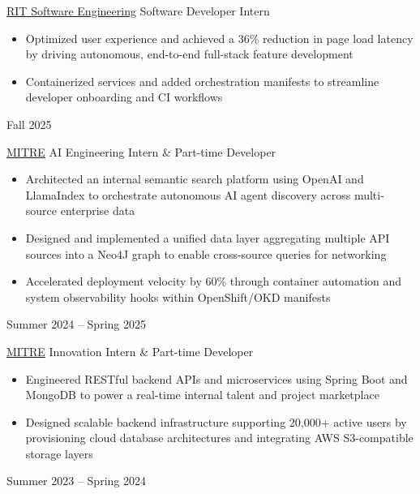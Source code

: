 \cvexperience
        {\href{https://www.rit.edu/computing/department-software-engineering}{RIT Software Engineering}}
        {Software Developer Intern}
        {
                \begin{itemize}
                        \item Optimized user experience and achieved a 36\% reduction in page load latency by driving autonomous, end-to-end full-stack feature development
                        \item Containerized services and added orchestration manifests to streamline developer onboarding and CI workflows
                \end{itemize}
        }
        {Fall 2025}
        {   }

\cvexperience
        {\href{https://www.mitre.org}{MITRE}}
        {AI Engineering Intern \& Part-time Developer}
        {
                \begin{itemize}
                        \item Architected an internal semantic search platform using OpenAI and LlamaIndex to orchestrate autonomous AI agent discovery across multi-source enterprise data
                        \item Designed and implemented a unified data layer aggregating multiple API sources into a Neo4J graph to enable cross-source queries for networking
                        \item Accelerated deployment velocity by 60\% through container automation and system observability hooks within OpenShift/OKD manifests
                \end{itemize}
        }
        {Summer 2024 -- Spring 2025}
        {    }

\cvexperience
        {\href{https://www.mitre.org}{MITRE}}
        {Innovation Intern \& Part-time Developer}
        {
                \begin{itemize}
                        \item Engineered RESTful backend APIs and microservices using Spring Boot and MongoDB to power a real-time internal talent and project marketplace
                        \item Designed scalable backend infrastructure supporting 20,000+ active users by provisioning cloud database architectures and integrating AWS S3-compatible storage layers
                \end{itemize}
        }
        {Summer 2023 -- Spring 2024}
        {  }

